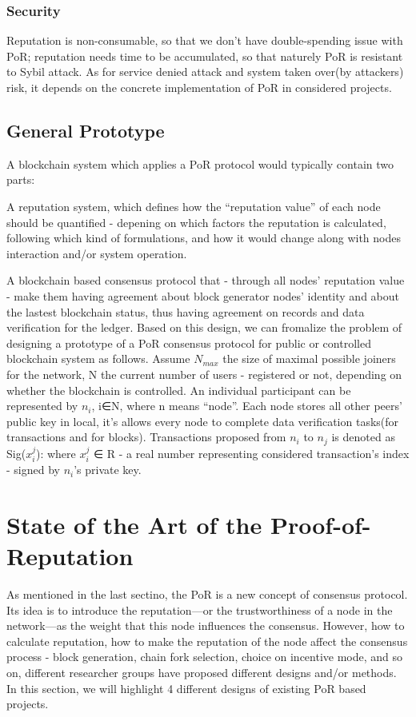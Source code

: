 \documentclass[doublespacing]{bmcart}
\begin{document}
\begin{CJK*}{UTF8}{gbsn}
\subsubsection*{Security}
 Reputation is non-consumable, so that we don't have double-spending issue with PoR; reputation needs time to be accumulated, so that naturely PoR is resistant to Sybil attack.
 As for service denied attack and system taken over(by attackers) risk, it depends on the concrete implementation of PoR in considered projects. 

\subsection{General Prototype}
A blockchain system which applies a PoR protocol would typically contain two parts:

  A reputation system, which defines how the ``reputation value'' of each node should be quantified - depening on which factors the reputation is calculated, following which kind of formulations, and how it would change along with nodes interaction and/or system operation.

 A blockchain based consensus protocol that - through all nodes' reputation value - make them having agreement about block generator nodes' identity and about the lastest blockchain status, thus having agreement on records and data verification for the ledger.  
 Based on this design, we can fromalize the problem of designing a prototype of a PoR consensus protocol for public or controlled blockchain system as follows. Assume $N_{max}$ the size of maximal possible joiners for the network, N the current number of users - registered or not, depending on whether the blockchain is controlled. An individual participant can be represented by $n_i$, i∈N, where n means ``node''. Each node stores all other peers' public key in local, it's allows every node to complete data verification tasks(for transactions and for blocks). Transactions proposed from $n_i$ to $n_j$ is denoted as
Sig($x_i^j$): where $x_i^j$ ∈ R - a real number representing considered transaction's index - signed by $n_i$'s private key. 

\section{State of the Art of the Proof-of-Reputation}
	 
	As mentioned in the last sectino, the PoR is a new concept of consensus protocol. Its idea is to introduce the reputation—or the trustworthiness of a node in the network—as the weight that this node influences the consensus. However, how to calculate reputation, how to make the reputation of the node affect the consensus process - block generation, chain fork selection, choice on incentive mode, and so on, different researcher groups have proposed different designs and/or methods. In this section, we will highlight 4 different designs of existing PoR based projects.

\end{CJK*}
\end{document}
